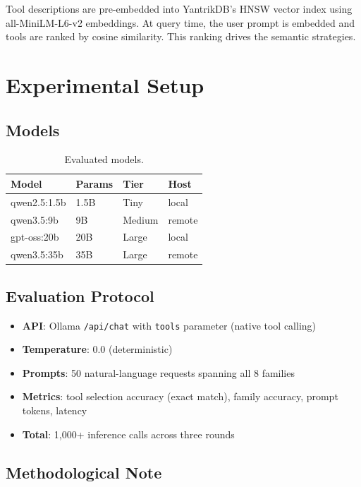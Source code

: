 \documentclass[11pt]{article}
\begin{document}
Tool descriptions are pre-embedded into YantrikDB's HNSW vector index using all-MiniLM-L6-v2 embeddings. At query time, the user prompt is embedded and tools are ranked by cosine similarity. This ranking drives the semantic strategies.

\section{Experimental Setup}

\subsection{Models}

\begin{table}[h]
\centering
\caption{Evaluated models.}
\label{tab:models}
\small
\begin{tabular}{@{}llll@{}}
\toprule
Model & Params & Tier & Host \\
\midrule
qwen2.5:1.5b & 1.5B & Tiny & local \\
qwen3.5:9b & 9B & Medium & remote \\
gpt-oss:20b & 20B & Large & local \\
qwen3.5:35b & 35B & Large & remote \\
\bottomrule
\end{tabular}
\end{table}

\subsection{Evaluation Protocol}

\begin{itemize}[nosep,leftmargin=*]
  \item \textbf{API}: Ollama \texttt{/api/chat} with \texttt{tools} parameter (native tool calling)
  \item \textbf{Temperature}: 0.0 (deterministic)
  \item \textbf{Prompts}: 50 natural-language requests spanning all 8 families
  \item \textbf{Metrics}: tool selection accuracy (exact match), family accuracy, prompt tokens, latency
  \item \textbf{Total}: 1,000+ inference calls across three rounds
\end{itemize}

\subsection{Methodological Note}
\end{document}
